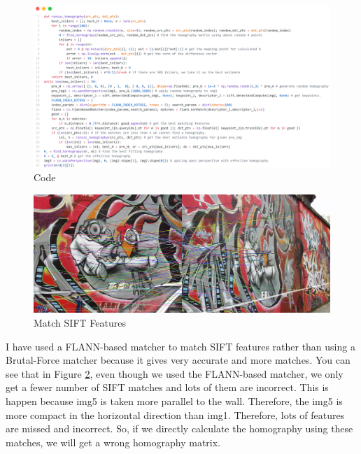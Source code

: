 \documentclass[a4paper]{article}
\begin{document}
\begin{figure}[!htb]
  \centering
  \includegraphics[width=\textwidth]{images/q3code.png}
  \caption{Code}
  \label{q3code}
\end{figure}
\begin{figure}[!htb]
  \centering
  \includegraphics[width=\textwidth]{images/stif.png}
  \caption{Match SIFT Features}
  \label{sift}
\end{figure}
I have used a FLANN-based matcher to match SIFT features rather
 than using a Brutal-Force matcher because it gives very accurate
  and more matches. You can see that in Figure \ref{sift},  even though we
   used the FLANN-based matcher, we only get a fewer number of SIFT
    matches and lots of them are incorrect. This is happen because
     img5 is taken more parallel to the wall. Therefore, the img5
      is more compact in the horizontal direction than img1.
       Therefore, lots of features are missed and incorrect.
        So, if we directly calculate the homography using these 
        matches, we will get a wrong homography matrix.
  
\end{document}
